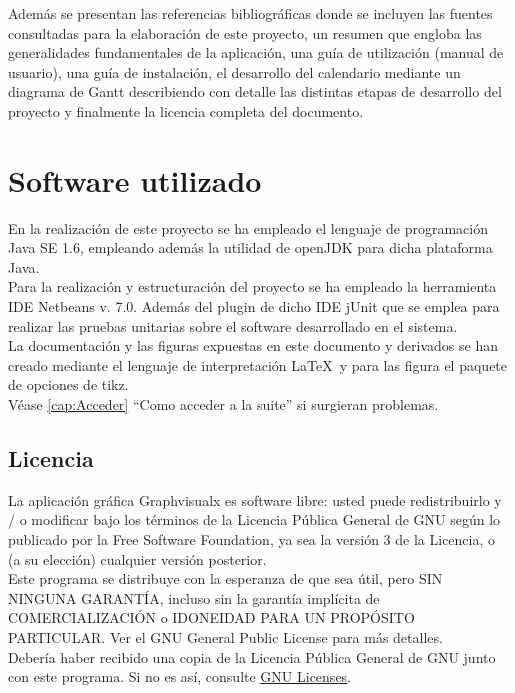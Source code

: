 Además se presentan las referencias bibliográficas donde se incluyen las fuentes consultadas para la elaboración de este proyecto, un resumen que engloba las generalidades fundamentales de la aplicación, una guía de utilización (manual de usuario), una guía de instalación, el desarrollo del calendario mediante un diagrama de Gantt describiendo con detalle las distintas etapas de desarrollo del proyecto y finalmente la licencia completa del documento. \\

\section{Software utilizado}

En la realización de este proyecto se ha empleado el lenguaje de programación Java SE 1.6, empleando además la utilidad de openJDK para dicha plataforma Java.\\

Para la realización y estructuración del proyecto se ha empleado la herramienta IDE Netbeans v. 7.0. Además del plugin de dicho IDE jUnit que se emplea para realizar las pruebas unitarias sobre el software desarrollado en el sistema.\\

La documentación y las figuras expuestas en este documento y derivados se han creado mediante el lenguaje de interpretación \LaTeX\ y para las figura el paquete de opciones de tikz.\\

Véase \ref{cap:Acceder} ``Como acceder a la suite''  si surgieran problemas.

\subsection{Licencia} 

La aplicación gráfica Graphvisualx es software libre: usted puede redistribuirlo y / o modificar bajo los términos de la Licencia Pública General de GNU según lo publicado por la Free Software Foundation, ya sea la versión 3 de la Licencia, o (a su elección) cualquier versión posterior.\\

Este programa se distribuye con la esperanza de que sea útil, pero SIN NINGUNA GARANTÍA, incluso sin la garantía implícita de COMERCIALIZACIÓN o IDONEIDAD PARA UN PROPÓSITO PARTICULAR. Ver el GNU General Public License para más detalles.\\

Debería haber recibido una copia de la Licencia Pública General de GNU junto con este programa. Si no es así, consulte \href{http://www.gnu.org/licenses/}{GNU Licenses}.\\
